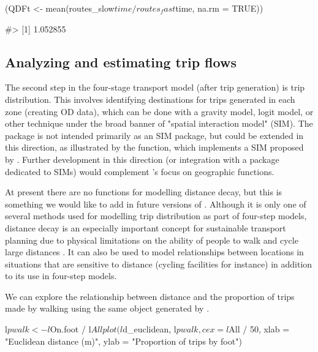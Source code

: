 \begin{Schunk}
\begin{Sinput}
(QDFt <- mean(routes_slow$time / routes_fast$time, na.rm = TRUE))
\end{Sinput}
\begin{Soutput}
#> [1] 1.052855
\end{Soutput}
\end{Schunk}

\subsection{Analyzing and estimating trip flows}\label{models-of-travel-behaviour}

The second step in the four-stage transport model (after trip generation) is trip distribution.
This involves identifying destinations for trips generated in each zone (creating OD data), which can be done with a gravity model, logit model, or other technique under the broad banner of "spatial interaction model" (SIM).
The  package is not intended primarily as an SIM package,
but could be extended in this direction, as illustrated by the  function, which implements a SIM proposed by \citet{simini_universal_2012}.
Further development in this direction (or integration with a package dedicated to SIMs) would complement 's focus on geographic functions.

At present there are no functions for modelling distance decay, but this
is something we would like to add in future versions of
.
Although it is only one of several methods used for modelling trip distribution as part of four-step models,
distance decay is an especially important concept for
sustainable transport planning due to physical limitations on the
ability of people to walk and cycle large distances
\citep{iacono_measuring_2010}.
It can also be used to model relationships between locations in situations that are sensitive to distance (cycling facilities for instance) in addition to its use in four-step models.

We can explore the relationship between distance and the proportion of
trips made by walking using the same object  generated by
.

\begin{Schunk}
\begin{Sinput}
l$pwalk <- l$On.foot / l$All
plot(l$d_euclidean, l$pwalk, cex = l$All / 50,
  xlab = "Euclidean distance (m)", ylab = "Proportion of trips by foot")
\end{Sinput}
\end{Schunk}

